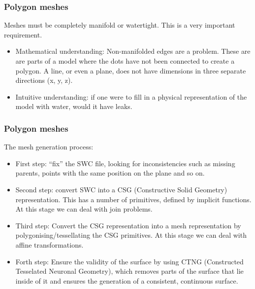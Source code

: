 \documentclass{beamer}
\begin{document}
\begin{frame}
\frametitle{Polygon meshes}

Meshes must be completely manifold or watertight. This is a very
important requirement.
\pause

\begin{itemize}
\item Mathematical understanding: Non-manifolded edges are a
  problem. These are are parts of a model where the dots have not been
  connected to create a polygon. A line, or even a plane, does not have
  dimensions in three separate directions (x, y, z).
\pause
\item Intuitive understanding: if one were to fill in a physical
  representation of the model with water, would it have leaks.
\end{itemize}

\end{frame}

\begin{frame}
\frametitle{Polygon meshes}

The mesh generation process:

\begin{itemize}
\item First step: ``fix'' the SWC file, looking for
  inconsistencies such as missing parents, points with the same
  position on the plane and so on.
\pause
\item Second step: convert SWC into a CSG (Constructive Solid Geometry)
  representation. This has a number of primitives, defined by implicit
  functions. At this stage we can deal with join problems.
\pause
\item Third step: Convert the CSG representation into a mesh
  representation by polygonising/tessellating the CSG primitives. At
  this stage we can deal with affine transformations.
\pause
\item Forth step: Ensure the validity of the surface by using CTNG
  (Constructed Tesselated Neuronal Geometry), which removes parts of
  the surface that lie inside of it and ensures the generation of a
  consistent, continuous surface.
\end{itemize}

\end{frame}
\end{document}
